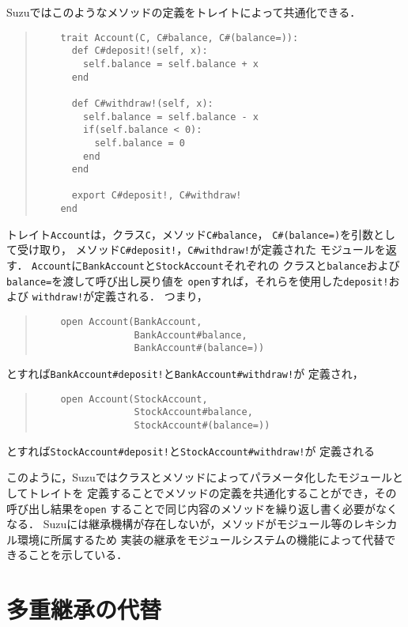 \documentclass[a4paper,11pt,dvipdfmx]{jreport}
\begin{document}
Suzuではこのようなメソッドの定義をトレイトによって共通化できる．
\begin{quote}
	\begin{verbatim}
	trait Account(C, C#balance, C#(balance=)):
	  def C#deposit!(self, x):
	    self.balance = self.balance + x
	  end
	
	  def C#withdraw!(self, x):
	    self.balance = self.balance - x
	    if(self.balance < 0):
	      self.balance = 0
	    end
	  end
	
	  export C#deposit!, C#withdraw!
	end
	\end{verbatim}
\end{quote}
トレイト\verb|Account|は，クラス\verb|C|，メソッド\verb|C#balance|，
\verb|C#(balance=)|を引数として受け取り，
メソッド\verb|C#deposit!|，\verb|C#withdraw!|が定義された
モジュールを返す．
\verb|Account|に\verb|BankAccount|と\verb|StockAccount|それぞれの
クラスと\verb|balance|および\verb|balance=|を渡して呼び出し戻り値を
\verb|open|すれば，それらを使用した\verb|deposit!|および
\verb|withdraw!|が定義される．
つまり，
\begin{quote}
	\begin{verbatim}
	open Account(BankAccount,
	             BankAccount#balance,
	             BankAccount#(balance=))
	\end{verbatim}
\end{quote}
とすれば\verb|BankAccount#deposit!|と\verb|BankAccount#withdraw!|が
定義され，
\begin{quote}
	\begin{verbatim}
	open Account(StockAccount,
	             StockAccount#balance,
	             StockAccount#(balance=))
	\end{verbatim}
\end{quote}
とすれば\verb|StockAccount#deposit!|と\verb|StockAccount#withdraw!|が
定義される

このように，Suzuではクラスとメソッドによってパラメータ化したモジュールとしてトレイトを
定義することでメソッドの定義を共通化することができ，その呼び出し結果を\verb|open|
することで同じ内容のメソッドを繰り返し書く必要がなくなる．
Suzuには継承機構が存在しないが，メソッドがモジュール等のレキシカル環境に所属するため
実装の継承をモジュールシステムの機能によって代替できることを示している．


\section{多重継承の代替}
\label{section:collision}
\end{document}
